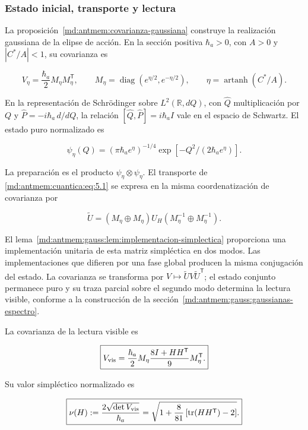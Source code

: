 \subsubsection{Estado inicial, transporte y lectura}

La proposición~\ref{md:antmem:covarianza-gaussiana} construye la realización gaussiana de la elipse de acción. En la sección positiva \(\hbar_a>0\), con \(A>0\) y \(|C^*/A|<1\), su covarianza es

\begin{equation}
V_\eta=\frac{\hbar_a}{2}M_\eta M_\eta^{\mathsf T},\qquad
M_\eta=\operatorname{diag}(e^{\eta/2},e^{-\eta/2}),\qquad
\eta=\operatorname{artanh}(C^*/A).
\label{md:antmem:cuantica:eq:5.4}
\end{equation}

En la representación de Schrödinger sobre \(L^2(\mathbb R,dQ)\), con \(\widehat Q\) multiplicación por \(Q\) y \(\widehat P=-i\hbar_a\,d/dQ\), la relación \([\widehat Q,\widehat P]=i\hbar_a I\) vale en el espacio de Schwartz. El estado puro normalizado es

\[
\psi_\eta(Q)=(\pi\hbar_a e^\eta)^{-1/4}
\exp[-Q^2/(2\hbar_a e^\eta)].
\]

La preparación es el producto \(\psi_\eta\otimes\psi_\eta\). El transporte de \eqref{md:antmem:cuantica:eq:5.1} se expresa en la misma coordenatización de covarianza por

\begin{equation}
\widetilde U=(M_\eta\oplus M_\eta)U_H
(M_\eta^{-1}\oplus M_\eta^{-1}).
\label{md:antmem:cuantica:eq:5.5}
\end{equation}

El lema~\ref{md:antmem:gauss:lem:implementacion-simplectica} proporciona una implementación unitaria de esta matriz simpléctica en dos modos. Las implementaciones que difieren por una fase global producen la misma conjugación del estado. La covarianza se transforma por \(V\mapsto\widetilde U V\widetilde U^{\mathsf T}\); el estado conjunto permanece puro y su traza parcial sobre el segundo modo determina la lectura visible, conforme a la construcción de la sección~\ref{md:antmem:gauss:gaussianas-espectro}.

\begin{theorem}

La covarianza de la lectura visible es

\begin{equation}
\boxed{V_{\rm vis}=
\frac{\hbar_a}{2}M_\eta
\frac{8I+HH^{\mathsf T}}9
M_\eta^{\mathsf T}.}
\label{md:antmem:cuantica:eq:5.6}
\end{equation}

Su valor simpléctico normalizado es

\begin{equation}
\boxed{\nu(H):=\frac{2\sqrt{\det V_{\rm vis}}}{\hbar_a}
=\sqrt{1+\frac8{81}\left[\operatorname{tr}(HH^{\mathsf T})-2\right]}.}
\label{md:antmem:cuantica:eq:5.7}
\end{equation}
\end{theorem}

